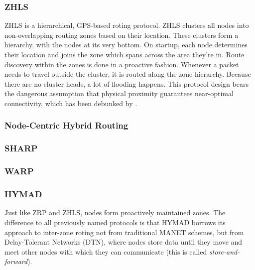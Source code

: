 \documentclass[a4paper,10pt]{scrartcl}
\begin{document}
\subsubsection{\gls{ZHLS}}
\label{subsec:zhls}
ZHLS is a hierarchical, GPS-based roting protocol. 
ZHLS clusters all nodes into non-overlapping routing zones based on their location. These clusters form a hierarchy, with the nodes at its very bottom.
On startup, each node determines their location and joins the zone which spans across the area they're in. Route discovery within the zones is done in a proactive fashion. Whenever a packet needs to travel outside the cluster, it is routed along the zone hierarchy. Because there are no cluster heads, a lot of flooding happens. 
This protocol design bears the dangerous assumption that physical proximity guarantees near-optimal connectivity, which has been debunked by \cite{mistaken-axioms}. 

\subsubsection{Node-Centric Hybrid Routing}
\label{subsec:nchr}


\subsubsection{\gls{SHARP}}
\label{subsec:sharp}

\subsubsection{\gls{WARP}}
\label{subsec:warp}

\subsubsection{\gls{HYMAD}}
\label{subsec:hymad}
Just like ZRP and ZHLS, nodes form proactively maintained zones. The difference to all previously named protocols is that HYMAD borrows its approach to inter-zone roting not from traditional \gls{MANET} schemes, but from Delay-Tolerant Networks (DTN), where nodes store data until they move and meet other nodes with which they can communicate (this is called \emph{store-and-forward}).
\end{document}
